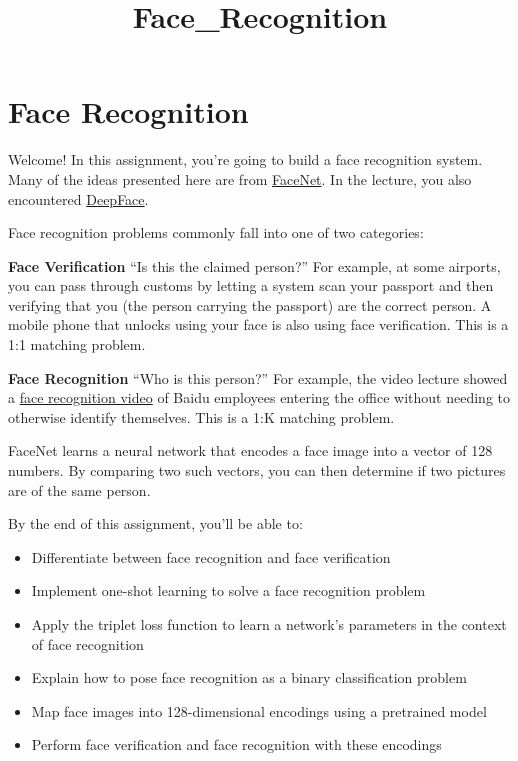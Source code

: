 \documentclass[11pt]{article}
\title{Face\_Recognition}
\providecommand{\tightlist}{%
      \setlength{\itemsep}{0pt}\setlength{\parskip}{0pt}}
\begin{document}
    
    \maketitle
    
    

    
    \hypertarget{face-recognition}{%
\section{Face Recognition}\label{face-recognition}}

Welcome! In this assignment, you're going to build a face recognition
system. Many of the ideas presented here are from
\href{https://arxiv.org/pdf/1503.03832.pdf}{FaceNet}. In the lecture,
you also encountered
\href{https://research.fb.com/wp-content/uploads/2016/11/deepface-closing-the-gap-to-human-level-performance-in-face-verification.pdf}{DeepFace}.

Face recognition problems commonly fall into one of two categories:

\textbf{Face Verification} ``Is this the claimed person?'' For example,
at some airports, you can pass through customs by letting a system scan
your passport and then verifying that you (the person carrying the
passport) are the correct person. A mobile phone that unlocks using your
face is also using face verification. This is a 1:1 matching problem.

\textbf{Face Recognition} ``Who is this person?'' For example, the video
lecture showed a \href{https://www.youtube.com/watch?v=wr4rx0Spihs}{face
recognition video} of Baidu employees entering the office without
needing to otherwise identify themselves. This is a 1:K matching
problem.

FaceNet learns a neural network that encodes a face image into a vector
of 128 numbers. By comparing two such vectors, you can then determine if
two pictures are of the same person.

By the end of this assignment, you'll be able to:

\begin{itemize}
\tightlist
\item
  Differentiate between face recognition and face verification
\item
  Implement one-shot learning to solve a face recognition problem
\item
  Apply the triplet loss function to learn a network's parameters in the
  context of face recognition
\item
  Explain how to pose face recognition as a binary classification
  problem
\item
  Map face images into 128-dimensional encodings using a pretrained
  model
\item
  Perform face verification and face recognition with these encodings
\end{itemize}
\end{document}
